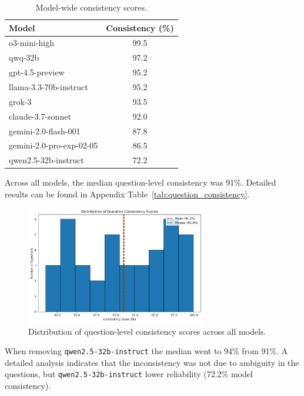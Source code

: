 \begin{table}[htbp]
    \centering
    \caption{Model-wide consistency scores.}
    \label{tab:model_consistency}
    \begin{tabular}{l c}
        \hline
        Model & Consistency (\%) \\
        \hline
        o3-mini-high & 99.5 \\
        qwq-32b & 97.2 \\
        gpt-4.5-preview & 95.2 \\
        llama-3.3-70b-instruct & 95.2 \\
        grok-3 & 93.5 \\
        claude-3.7-sonnet & 92.0 \\
        gemini-2.0-flash-001 & 87.8 \\
        gemini-2.0-pro-exp-02-05 & 86.5 \\
        qwen2.5-32b-instruct & 72.2 \\
        \hline
    \end{tabular}
\end{table}

Across all models, the median question-level consistency was 91\%. Detailed results can be found in Appendix Table~\ref{tab:question_consistency}.

\begin{figure}[htbp]
    \centering
    \includegraphics[width=0.7\textwidth]{figures/histogram_question_consistency.png}
    \caption{Distribution of question-level consistency scores across all models.}
    \label{fig:question_consistency}
\end{figure}

When removing \texttt{qwen2.5-32b-instruct} the median went to 94\% from 91\%. A detailed analysis indicates that the inconsistency was not due to ambiguity in the questions, but \texttt{qwen2.5-32b-instruct} lower reliability (72.2\% model consistency).

